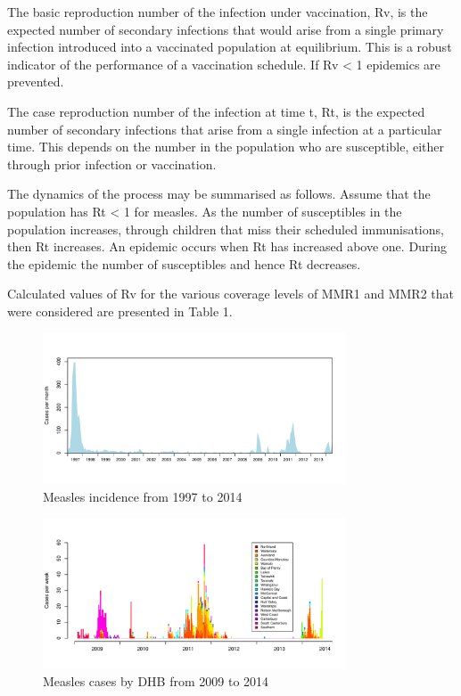 \documentclass{article}
\begin{document}
The basic reproduction number of the infection under vaccination, Rv,
is the expected number of secondary infections that would arise from a
single primary infection introduced into a vaccinated population at equilibrium.
This is a robust indicator of the performance of a vaccination
schedule. If Rv < 1 epidemics are prevented.

The case reproduction number of the infection at time t, Rt, is the
expected number of secondary infections that arise from a single infection
at a particular time. This depends on the number in the population who
are susceptible, either through prior infection or vaccination.

The dynamics of the process may be summarised as follows. Assume that
the population has Rt < 1 for measles. As the number of susceptibles in the
population increases, through children that miss their scheduled immunisations,
then Rt increases. An epidemic occurs when Rt has increased above
one. During the epidemic the number of susceptibles and hence Rt decreases.


Calculated values of Rv for the various coverage levels of MMR1 and MMR2
that were considered are presented in Table 1.

\begin{figure}
     \centering
     \includegraphics[width=0.8\textwidth]{incidence_1997_2014.pdf}
     \caption{Measles incidence from 1997 to 2014}
\end{figure}

\begin{figure}
     \centering
     \includegraphics[width=0.8\textwidth]{cases_by_dhb_2009_2014.pdf}
     \caption{Measles cases by DHB from 2009 to 2014}
\end{figure}
\end{document}
